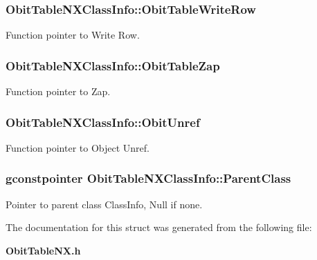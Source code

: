 \subsubsection{ {\bf Obit\-Table\-NXClass\-Info::Obit\-Table\-Write\-Row}}\label{structObitTableNXClassInfo_o26}


Function pointer to Write Row. 

\subsubsection{ {\bf Obit\-Table\-NXClass\-Info::Obit\-Table\-Zap}}\label{structObitTableNXClassInfo_o19}


Function pointer to Zap. 

\subsubsection{ {\bf Obit\-Table\-NXClass\-Info::Obit\-Unref}}\label{structObitTableNXClassInfo_o11}


Function pointer to Object Unref. 

\subsubsection{\setlength{\rightskip}{0pt plus 5cm}gconstpointer {\bf Obit\-Table\-NXClass\-Info::Parent\-Class}}\label{structObitTableNXClassInfo_o3}


Pointer to parent class Class\-Info, Null if none. 



The documentation for this struct was generated from the following file:\begin{CompactItemize}
\item 
{\bf Obit\-Table\-NX.h}\end{CompactItemize}
